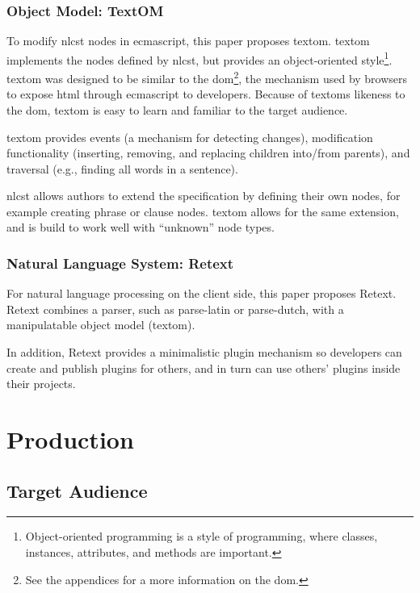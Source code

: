 \subsection{Object Model: TextOM}\label{object-model}

To modify \gls{nlcst} nodes in \gls{ecmascript}, this paper proposes
\gls{textom}. \gls{textom} implements the nodes defined by \gls{nlcst},
but provides an object-oriented style\footnote{Object-oriented
  programming is a style of programming, where classes, instances,
  attributes, and methods are important.}. \gls{textom} was designed to
be similar to the \gls{dom}\footnote{See the appendices for a more
  information on the \gls{dom}.}, the mechanism used by browsers to
expose \gls{html} through \gls{ecmascript} to developers. Because of
\glspl{textom} likeness to the \gls{dom}, \gls{textom} is easy to learn
and familiar to the target audience.

\Gls{textom} provides events (a mechanism for detecting changes),
modification functionality (inserting, removing, and replacing children
into/from parents), and traversal (e.g., finding all words in a
sentence).

\Gls{nlcst} allows authors to extend the specification by defining their
own nodes, for example creating phrase or clause nodes. \Gls{textom}
allows for the same extension, and is build to work well with
``unknown'' node types.

\subsection{Natural Language System:
Retext}\label{natural-language-system-retext}

For natural language processing on the client side, this paper proposes
Retext. Retext combines a parser, such as parse-latin or parse-dutch,
with a manipulatable object model (\gls{textom}).

In addition, Retext provides a minimalistic plugin mechanism so
developers can create and publish plugins for others, and in turn can
use others' plugins inside their projects.

\chapter{Production}\label{production}

\section{Target Audience}\label{target-audience}

